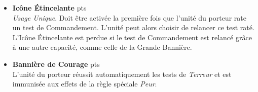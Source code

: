 \begin{multicols}{2}
\begin{itemize}[label={-}]
\item \textbf{Icône Étincelante}  {pts} \\
\emph{Usage Unique}. Doit être activée la première fois que l'unité du porteur rate un test de Commandement. L'unité peut alors choisir de relancer ce test raté. L'Icône Étincelante est perdue si le test de Commandement est relancé grâce à une autre capacité, comme celle de la Grande Bannière.

\item \textbf{Bannière de Courage}  {pts} \\
L'unité du porteur réussit automatiquement les tests de \emph{Terreur} et est immunisée aux effets de la règle spéciale \emph{Peur}.

\end{itemize}
\end{multicols}
